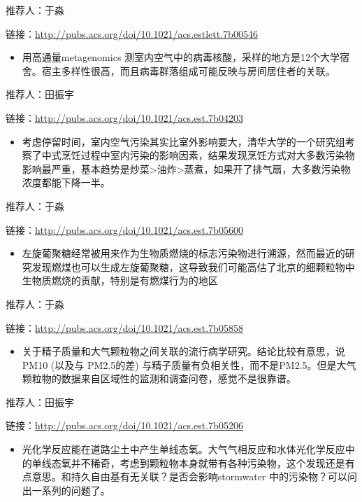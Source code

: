 \documentclass[]{book}
\providecommand{\tightlist}{%
  \setlength{\itemsep}{0pt}\setlength{\parskip}{0pt}}
\begin{document}
推荐人：于淼

链接：\url{http://pubs.acs.org/doi/10.1021/acs.estlett.7b00546}

\begin{itemize}
\tightlist
\item
  用高通量metagenomics
  测室内空气中的病毒核酸，采样的地方是12个大学宿舍。宿主多样性很高，而且病毒群落组成可能反映与房间居住者的关联。
\end{itemize}

推荐人：田振宇

链接：\url{http://pubs.acs.org/doi/10.1021/acs.est.7b04203}

\begin{itemize}
\tightlist
\item
  考虑停留时间，室内空气污染其实比室外影响要大，清华大学的一个研究组考察了中式烹饪过程中室内污染的影响因素，结果发现烹饪方式对大多数污染物影响最严重，基本趋势是炒菜\textgreater{}油炸\textgreater{}蒸煮，如果开了排气扇，大多数污染物浓度都能下降一半。
\end{itemize}

推荐人：于淼

链接：\url{http://pubs.acs.org/doi/10.1021/acs.est.7b05600}

\begin{itemize}
\tightlist
\item
  左旋葡聚糖经常被用来作为生物质燃烧的标志污染物进行溯源，然而最近的研究发现燃煤也可以生成左旋葡聚糖，这导致我们可能高估了北京的细颗粒物中生物质燃烧的贡献，特别是有燃煤行为的地区
\end{itemize}

推荐人：于淼

链接：\url{http://pubs.acs.org/doi/10.1021/acs.est.7b05858}

\begin{itemize}
\tightlist
\item
  关于精子质量和大气颗粒物之间关联的流行病学研究。结论比较有意思，说
  PM10 (以及与 PM2.5的差)
  与精子质量有负相关性，而不是PM2.5。但是大气颗粒物的数据来自区域性的监测和调查问卷，感觉不是很靠谱。
\end{itemize}

推荐人：田振宇

链接：\url{http://pubs.acs.org/doi/10.1021/acs.est.7b05206}

\begin{itemize}
\tightlist
\item
  光化学反应能在道路尘土中产生单线态氧。大气气相反应和水体光化学反应中的单线态氧并不稀奇，考虑到颗粒物本身就带有各种污染物，这个发现还是有点意思。和持久自由基有无关联？是否会影响stormwater
  中的污染物？可以问出一系列的问题了。
\end{itemize}
\end{document}

